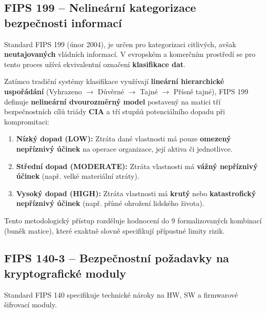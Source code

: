 \documentclass[10pt,a4paper]{article}
\begin{document}
	\subsection{FIPS 199 -- Nelineární kategorizace bezpečnosti informací}
	Standard FIPS 199 (únor 2004), je určen pro kategorizaci citlivých, avšak \textbf{neutajovaných} vládních informací. V evropském a komerčním prostředí se pro tento proces užívá ekvivalentní označení \textbf{klasifikace dat}.
	
	Zatímco tradiční systémy klasifikace využívají \textbf{lineární hierarchické uspořádání} (Vyhrazeno $\rightarrow$ Důvěrné $\rightarrow$ Tajné $\rightarrow$ Přísně tajné), FIPS 199 definuje \textbf{nelineární dvourozměrný model} postavený na matici tří bezpečnostních cílů triády \textbf{CIA} a tří stupňů potenciálního dopadu při kompromitaci:
	\begin{enumerate}
		\item \textbf{Nízký dopad (LOW):} Ztráta dané vlastnosti má pouze \textbf{omezený nepříznivý účinek} na operace organizace, její aktiva či jednotlivce.
		
		\item \textbf{Střední dopad (MODERATE):} Ztráta vlastnosti má \textbf{vážný nepříznivý účinek} (např. velké materiální ztráty).
		
		\item \textbf{Vysoký dopad (HIGH):} Ztráta vlastnosti má \textbf{krutý} nebo \textbf{katastrofický nepříznivý účinek} (např. přímé ohrožení lidského života).
	\end{enumerate}
	Tento metodologický přístup rozděluje hodnocení do 9 formalizovaných kombinací (buněk matice), které exaktně slovně specifikují přípustné limity rizik.
	
	\subsection{FIPS 140-3 -- Bezpečnostní požadavky na kryptografické moduly}
	Standard FIPS 140 specifikuje technické nároky na HW, SW a firmwarové šifrovací moduly. 	
\end{document}
